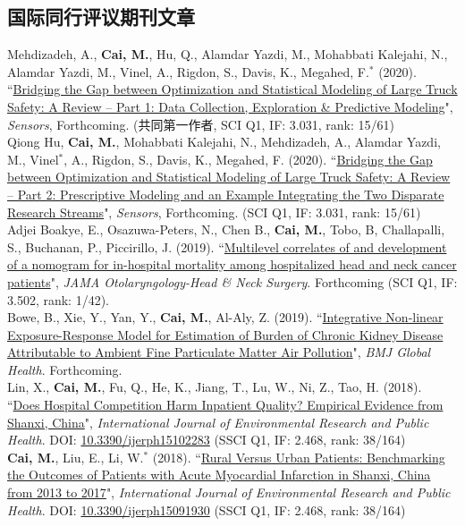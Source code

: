 \documentclass[11pt, a4paper]{article}
\newcommand{\years}[1]{\marginnote{\scriptsize #1}}
\begin{document}
\subsection*{国际同行评议期刊文章}
\noindent
\years{2020}Mehdizadeh, A., \textbf{Cai, M.}, Hu, Q., Alamdar Yazdi, M., Mohabbati Kalejahi, N., Alamdar Yazdi, M., Vinel, A., Rigdon, S., Davis, K., Megahed, F.$^\ast$ (2020). ``\ul{Bridging the Gap between Optimization and Statistical Modeling of Large Truck Safety: A Review -- Part 1: Data Collection, Exploration \& Predictive Modeling}", \emph{Sensors}, Forthcoming. (共同第一作者, SCI Q1, IF: 3.031, rank: 15/61)\\
\years{2020}Qiong Hu, \textbf{Cai, M.}, Mohabbati Kalejahi, N., Mehdizadeh, A., Alamdar Yazdi, M., Vinel$^\ast$, A., Rigdon, S., Davis, K., Megahed, F. (2020). ``\ul{Bridging the Gap between Optimization and Statistical Modeling of Large Truck Safety: A Review -- Part 2: Prescriptive Modeling and an Example Integrating the Two Disparate Research Streams}", \emph{Sensors}, Forthcoming. (SCI Q1, IF: 3.031, rank: 15/61)\\
\years{2019}Adjei Boakye, E., Osazuwa-Peters, N., Chen B., \textbf{Cai, M.}, Tobo, B, Challapalli, S., Buchanan, P., Piccirillo, J. (2019). ``\ul{Multilevel correlates of and development of a nomogram for in-hospital mortality among hospitalized head and neck cancer patients}", \emph{JAMA Otolaryngology-Head \& Neck Surgery}. Forthcoming (SCI Q1, IF: 3.502, rank: 1/42).\\
\years{2019}Bowe, B., Xie, Y., Yan, Y., \textbf{Cai, M.}, Al-Aly, Z. (2019). ``\ul{Integrative Non-linear Exposure-Response Model for Estimation of Burden of Chronic Kidney Disease Attributable to Ambient Fine Particulate Matter Air Pollution}", \emph{BMJ Global Health}. Forthcoming. \\
\years{2018}Lin, X., \textbf{Cai, M.}, Fu, Q., He, K., Jiang, T., Lu, W., Ni, Z., Tao, H. (2018). ``\ul{Does Hospital Competition Harm Inpatient Quality? Empirical Evidence from Shanxi, China}", \emph{International Journal of Environmental Research and Public Health}. DOI: \href{https://doi.org/10.3390/ijerph15102283}{10.3390/ijerph15102283} (SSCI Q1, IF: 2.468, rank: 38/164)\\
\years{2018}\textbf{Cai, M.}, Liu, E., Li, W.$^\ast$ (2018). ``\ul{Rural Versus Urban Patients: Benchmarking the Outcomes of Patients with Acute Myocardial Infarction in Shanxi, China from 2013 to 2017}", \emph{International Journal of Environmental Research and Public Health}. DOI: \href{https://doi.org/10.3390/ijerph15091930}{10.3390/ijerph15091930} (SSCI Q1, IF: 2.468, rank: 38/164)\\
\end{document}
